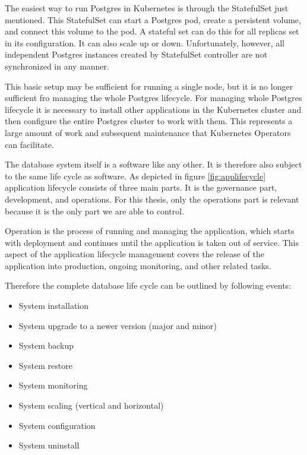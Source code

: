 The easiest way to run Postgres in Kubernetes is through the StatefulSet just mentioned. This StatefulSet can start a Postgres pod, create a persistent volume, and connect this volume to the pod. A stateful set can do this for all replicas set in its configuration. It can also scale up or down. Unfortunately, however, all independent Postgres instances created by StatefulSet controller are not synchronized in any manner.

This basic setup may be sufficient for running a single node, but it is no longer sufficient fro managing the whole Postgres lifecycle. For managing whole Postgres lifecycle it is necessary to install other applications in the Kubernetes cluster and then configure the entire Postgres cluster to work with them. This represents a large amount of work and subsequent maintenance that Kubernetes Operators can facilitate.

The database system itself is a software like any other. It is therefore also subject to the same life cycle as software.
As depicted in figure \ref{fig:applifecycle} application lifecycle consists of three main parts. It is the governance part, development, and operations. For this thesis, only the operations part is relevant because it is the only part we are able to control.

Operation is the process of running and managing the application, which starts with deployment and continues until the application is taken out of service. This aspect of the application lifecycle management covers the release of the application into production, ongoing monitoring, and other related tasks. \cite{ALM}

Therefore the complete database life cycle can be outlined by following events:
\begin{itemize}
  \item System installation
  \item System upgrade to a newer version (major and minor)
  \item System backup
  \item System restore
  \item System monitoring
  \item System scaling (vertical and horizontal)
  \item System configuration
  \item System uninstall
\end{itemize}

